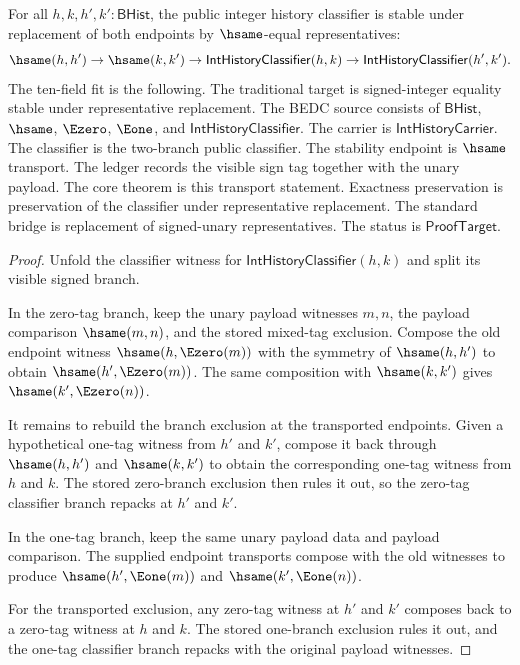 \begin{theorem}
\label{thm:int-history-classifier-hsame-transport}
For all $h,k,h',k':\mathsf{BHist}$, the public integer history classifier is
stable under replacement of both endpoints by $\hsame$-equal representatives:
$$
\hsame(h,h')\to
\hsame(k,k')\to
\mathsf{IntHistoryClassifier}(h,k)\to
\mathsf{IntHistoryClassifier}(h',k').
$$
The ten-field fit is the following. The traditional target is signed-integer
equality stable under representative replacement. The BEDC source consists of
$\mathsf{BHist}$, $\hsame$, $\Ezero$, $\Eone$, and
$\mathsf{IntHistoryClassifier}$. The carrier is
$\mathsf{IntHistoryCarrier}$. The classifier is the two-branch public
classifier. The stability endpoint is $\hsame$ transport. The ledger records
the visible sign tag together with the unary payload. The core theorem is this
transport statement. Exactness preservation is preservation of the classifier
under representative replacement. The standard bridge is replacement of
signed-unary representatives. The status is $\mathsf{ProofTarget}$.
\end{theorem}
\begin{proof}
Unfold the classifier witness for $\mathsf{IntHistoryClassifier}(h,k)$ and
split its visible signed branch.

In the zero-tag branch, keep the unary payload witnesses $m,n$, the payload
comparison $\hsame(m,n)$, and the stored mixed-tag exclusion. Compose the old
endpoint witness $\hsame(h,\Ezero(m))$ with the symmetry of $\hsame(h,h')$ to
obtain $\hsame(h',\Ezero(m))$. The same composition with $\hsame(k,k')$ gives
$\hsame(k',\Ezero(n))$.

It remains to rebuild the branch exclusion at the transported endpoints. Given
a hypothetical one-tag witness from $h'$ and $k'$, compose it back through
$\hsame(h,h')$ and $\hsame(k,k')$ to obtain the corresponding one-tag witness
from $h$ and $k$. The stored zero-branch exclusion then rules it out, so the
zero-tag classifier branch repacks at $h'$ and $k'$.

In the one-tag branch, keep the same unary payload data and payload
comparison. The supplied endpoint transports compose with the old witnesses to
produce $\hsame(h',\Eone(m))$ and $\hsame(k',\Eone(n))$.

For the transported exclusion, any zero-tag witness at $h'$ and $k'$ composes
back to a zero-tag witness at $h$ and $k$. The stored one-branch exclusion
rules it out, and the one-tag classifier branch repacks with the original
payload witnesses.
\end{proof}

\closureat{\IntUp}{\checkedCertStr}
